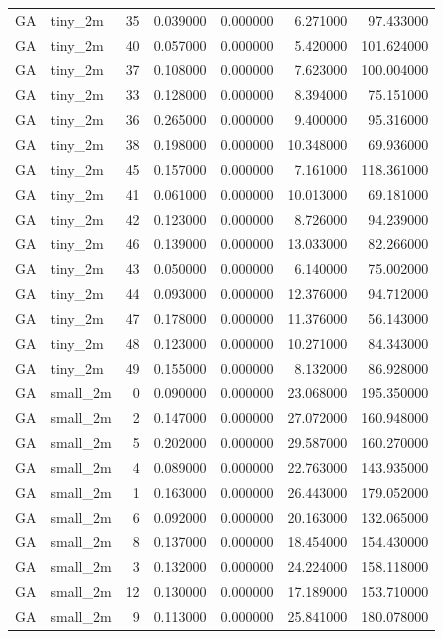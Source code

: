 \begin{tabular}{llrrrrr}
GA & tiny_2m & 35 & 0.039000 & 0.000000 & 6.271000 & 97.433000 \\
GA & tiny_2m & 40 & 0.057000 & 0.000000 & 5.420000 & 101.624000 \\
GA & tiny_2m & 37 & 0.108000 & 0.000000 & 7.623000 & 100.004000 \\
GA & tiny_2m & 33 & 0.128000 & 0.000000 & 8.394000 & 75.151000 \\
GA & tiny_2m & 36 & 0.265000 & 0.000000 & 9.400000 & 95.316000 \\
GA & tiny_2m & 38 & 0.198000 & 0.000000 & 10.348000 & 69.936000 \\
GA & tiny_2m & 45 & 0.157000 & 0.000000 & 7.161000 & 118.361000 \\
GA & tiny_2m & 41 & 0.061000 & 0.000000 & 10.013000 & 69.181000 \\
GA & tiny_2m & 42 & 0.123000 & 0.000000 & 8.726000 & 94.239000 \\
GA & tiny_2m & 46 & 0.139000 & 0.000000 & 13.033000 & 82.266000 \\
GA & tiny_2m & 43 & 0.050000 & 0.000000 & 6.140000 & 75.002000 \\
GA & tiny_2m & 44 & 0.093000 & 0.000000 & 12.376000 & 94.712000 \\
GA & tiny_2m & 47 & 0.178000 & 0.000000 & 11.376000 & 56.143000 \\
GA & tiny_2m & 48 & 0.123000 & 0.000000 & 10.271000 & 84.343000 \\
GA & tiny_2m & 49 & 0.155000 & 0.000000 & 8.132000 & 86.928000 \\
GA & small_2m & 0 & 0.090000 & 0.000000 & 23.068000 & 195.350000 \\
GA & small_2m & 2 & 0.147000 & 0.000000 & 27.072000 & 160.948000 \\
GA & small_2m & 5 & 0.202000 & 0.000000 & 29.587000 & 160.270000 \\
GA & small_2m & 4 & 0.089000 & 0.000000 & 22.763000 & 143.935000 \\
GA & small_2m & 1 & 0.163000 & 0.000000 & 26.443000 & 179.052000 \\
GA & small_2m & 6 & 0.092000 & 0.000000 & 20.163000 & 132.065000 \\
GA & small_2m & 8 & 0.137000 & 0.000000 & 18.454000 & 154.430000 \\
GA & small_2m & 3 & 0.132000 & 0.000000 & 24.224000 & 158.118000 \\
GA & small_2m & 12 & 0.130000 & 0.000000 & 17.189000 & 153.710000 \\
GA & small_2m & 9 & 0.113000 & 0.000000 & 25.841000 & 180.078000 \\

\end{tabular}
